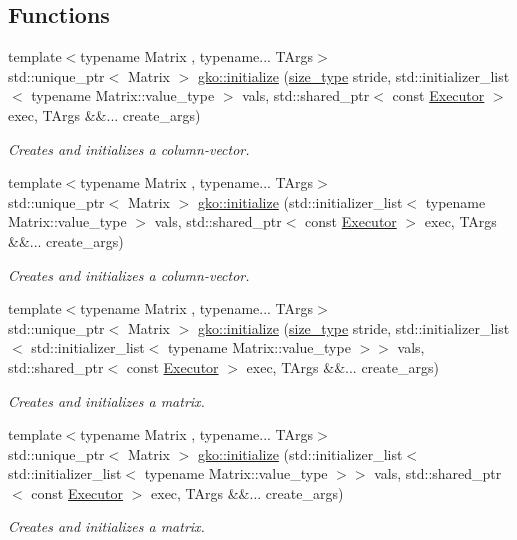 \subsection*{Functions}
\begin{DoxyCompactItemize}
\item 
{\footnotesize template$<$typename Matrix , typename... T\+Args$>$ }\\std\+::unique\+\_\+ptr$<$ Matrix $>$ \hyperlink{group__mat__formats_ga2f54bac1e95fb3ef03974fa9c9088491}{gko\+::initialize} (\hyperlink{namespacegko_a6e5c95df0ae4e47aab2f604a22d98ee7}{size\+\_\+type} stride, std\+::initializer\+\_\+list$<$ typename Matrix\+::value\+\_\+type $>$ vals, std\+::shared\+\_\+ptr$<$ const \hyperlink{classgko_1_1Executor}{Executor} $>$ exec, T\+Args \&\&... create\+\_\+args)
\begin{DoxyCompactList}\small\item\em Creates and initializes a column-\/vector. \end{DoxyCompactList}\item 
{\footnotesize template$<$typename Matrix , typename... T\+Args$>$ }\\std\+::unique\+\_\+ptr$<$ Matrix $>$ \hyperlink{group__mat__formats_gaac5f7b4ff3b43dbc6918c687dd7d2d2e}{gko\+::initialize} (std\+::initializer\+\_\+list$<$ typename Matrix\+::value\+\_\+type $>$ vals, std\+::shared\+\_\+ptr$<$ const \hyperlink{classgko_1_1Executor}{Executor} $>$ exec, T\+Args \&\&... create\+\_\+args)
\begin{DoxyCompactList}\small\item\em Creates and initializes a column-\/vector. \end{DoxyCompactList}\item 
{\footnotesize template$<$typename Matrix , typename... T\+Args$>$ }\\std\+::unique\+\_\+ptr$<$ Matrix $>$ \hyperlink{group__mat__formats_gaaf2520e5921e1bea00853c290f4fc28f}{gko\+::initialize} (\hyperlink{namespacegko_a6e5c95df0ae4e47aab2f604a22d98ee7}{size\+\_\+type} stride, std\+::initializer\+\_\+list$<$ std\+::initializer\+\_\+list$<$ typename Matrix\+::value\+\_\+type $>$$>$ vals, std\+::shared\+\_\+ptr$<$ const \hyperlink{classgko_1_1Executor}{Executor} $>$ exec, T\+Args \&\&... create\+\_\+args)
\begin{DoxyCompactList}\small\item\em Creates and initializes a matrix. \end{DoxyCompactList}\item 
{\footnotesize template$<$typename Matrix , typename... T\+Args$>$ }\\std\+::unique\+\_\+ptr$<$ Matrix $>$ \hyperlink{group__mat__formats_gabe4ff67be5b3aae4e981b33ea9883385}{gko\+::initialize} (std\+::initializer\+\_\+list$<$ std\+::initializer\+\_\+list$<$ typename Matrix\+::value\+\_\+type $>$$>$ vals, std\+::shared\+\_\+ptr$<$ const \hyperlink{classgko_1_1Executor}{Executor} $>$ exec, T\+Args \&\&... create\+\_\+args)
\begin{DoxyCompactList}\small\item\em Creates and initializes a matrix. \end{DoxyCompactList}\end{DoxyCompactItemize}


